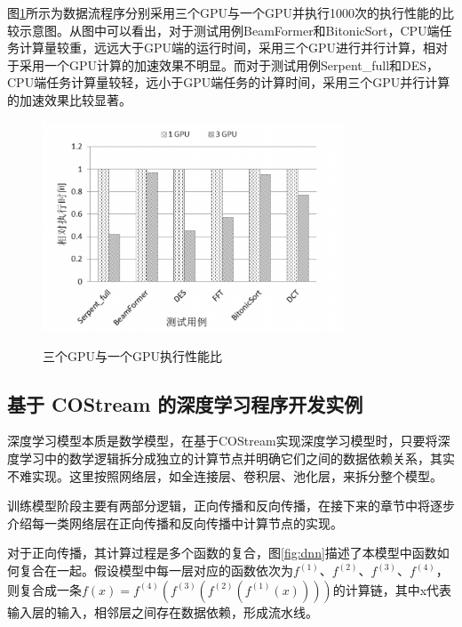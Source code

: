 图\ref{fig:3gpu-1gpu}所示为数据流程序分别采用三个GPU与一个GPU并执行1000次的执行性能的比较示意图。从图中可以看出，对于测试用例BeamFormer和BitonicSort，CPU端任务计算量较重，远远大于GPU端的运行时间，采用三个GPU进行并行计算，相对于采用一个GPU计算的加速效果不明显。而对于测试用例Serpent\_full和DES，CPU端任务计算量较轻，远小于GPU端任务的计算时间，采用三个GPU并行计算的加速效果比较显著。

\begin{figure}[htbp]
  \centering
  \includegraphics[width=0.8\textwidth]{Img/Chap_Application/Yu/3gpu-1gpu.png}\\
  \caption{三个GPU与一个GPU执行性能比}\label{fig:3gpu-1gpu}
\end{figure}

\subsection{基于 COStream 的深度学习程序开发实例}

深度学习模型本质是数学模型，在基于COStream实现深度学习模型时，只要将深度学习中的数学逻辑拆分成独立的计算节点并明确它们之间的数据依赖关系，其实不难实现。这里按照网络层，如全连接层、卷积层、池化层，来拆分整个模型。

训练模型阶段主要有两部分逻辑，正向传播和反向传播，在接下来的章节中将逐步介绍每一类网络层在正向传播和反向传播中计算节点的实现。

对于正向传播，其计算过程是多个函数的复合，图\ref{fig:dnn}描述了本模型中函数如何复合在一起。假设模型中每一层对应的函数依次为$f^{\left (1 \right )}$、$f^{\left (2 \right )}$、$f^{\left (3 \right )}$、$f^{\left (4 \right )}$，则复合成一条$f\left ( x \right )= f^{\left (4 \right )}\left ( f^{\left (3 \right )}\left ( f^{\left (2 \right )}\left ( f^{\left (1 \right )}\left ( x \right ) \right ) \right ) \right )$的计算链，其中x代表输入层的输入，相邻层之间存在数据依赖，形成流水线。

